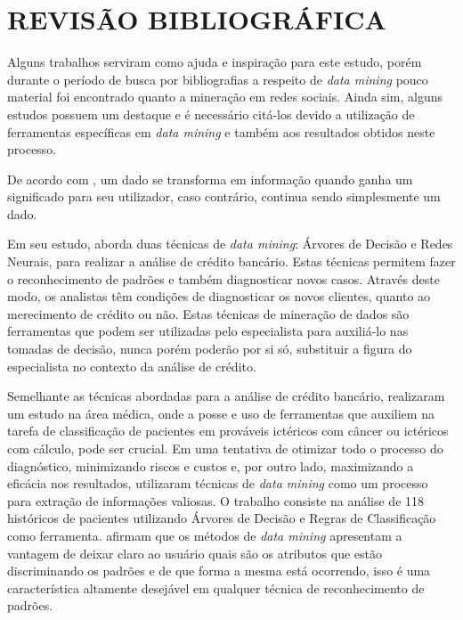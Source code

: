 \chapter{REVISÃO BIBLIOGRÁFICA}\label{ch:rev-bibs}

Alguns trabalhos serviram como ajuda e inspiração para este estudo, porém durante o período de busca por bibliografias a respeito de \textit{data mining} pouco material foi encontrado quanto a mineração em redes sociais. Ainda sim, alguns estudos possuem um destaque e é necessário citá-los devido a utilização de ferramentas específicas em \textit{data mining} e também aos resultados obtidos neste processo.

De acordo com , um dado se transforma em informação quando ganha um significado para seu utilizador, caso contrário, continua sendo simplesmente um dado.

Em seu estudo,  aborda duas técnicas de \textit{data mining}: Árvores de Decisão e Redes Neurais, para realizar a análise de crédito bancário. Estas técnicas permitem fazer o reconhecimento de padrões e também diagnosticar novos casos. Através deste modo, os analistas têm condições de diagnosticar os novos clientes, quanto ao merecimento de crédito ou não. Estas técnicas de mineração de dados são ferramentas que podem ser utilizadas pelo especialista para auxiliá-lo nas tomadas de decisão, nunca porém poderão por si só, substituir a figura do especialista no contexto da análise de crédito.

Semelhante as técnicas abordadas para a análise de crédito bancário,  realizaram um estudo na área médica, onde a posse e uso de ferramentas que auxiliem na tarefa de classificação de pacientes em prováveis ictéricos com câncer ou ictéricos com cálculo, pode ser crucial. Em uma tentativa de otimizar todo o processo do diagnóstico, minimizando riscos e custos e, por outro lado, maximizando a eficácia nos resultados, utilizaram técnicas de  \textit{data mining} como um processo para extração de informações valiosas. O trabalho consiste na análise de 118 históricos de pacientes utilizando Árvores de Decisão e Regras de Classificação como ferramenta.  afirmam que os métodos de \textit{data mining} apresentam a vantagem de deixar claro ao usuário quais são os atributos que estão discriminando os padrões e de que forma a mesma está ocorrendo, isso é uma característica altamente desejável em qualquer técnica de reconhecimento de padrões.

